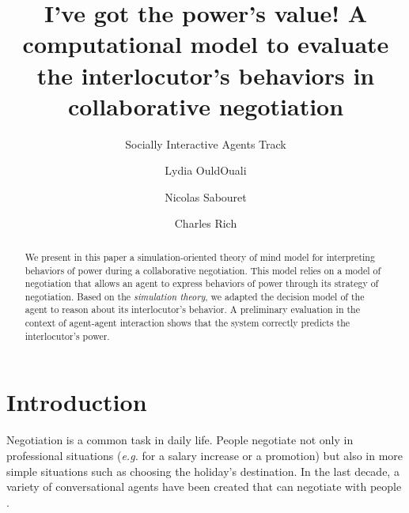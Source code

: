 \documentclass[sigconf]{aamas}  %
\begin{document}
	
	\title{I've got the power's value! A computational model to evaluate the interlocutor's behaviors in collaborative negotiation}  %

	\subtitle{Socially Interactive Agents Track}

	
	

	\author{Lydia OuldOuali}
	
	\author{Nicolas Sabouret}
	
	
	\author{Charles Rich}
	

	
	\begin{abstract}  %
		We present in this paper a simulation-oriented theory of mind model for interpreting behaviors of power during a collaborative negotiation. This model relies on a model of negotiation that allows an agent to express behaviors of power through its strategy of negotiation. Based on the \emph{simulation theory}, we adapted the decision model of the agent to reason about its interlocutor's behavior. A preliminary evaluation in the context of agent-agent interaction shows that the system correctly predicts the interlocutor's power.
	\end{abstract}
	

	
	\maketitle

	
	\section{Introduction}
	
	Negotiation is a common task in daily life. People negotiate not only in professional situations (\emph{e.g.} for a salary increase or a promotion) but also in more simple situations such as choosing the holiday's destination. In the last decade, a variety of conversational agents have been created that can negotiate with people \cite{pynadath2013you,gratch2016misrepresentation,klatt2011negotiations}.
	
\end{document}
